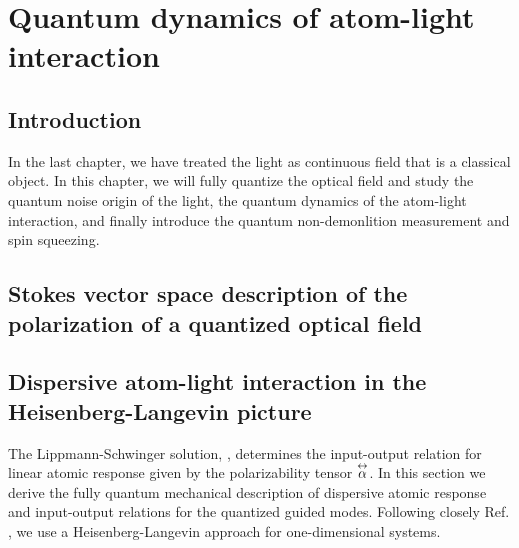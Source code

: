 \chapter{Quantum dynamics of atom-light interaction}
\section{Introduction}
In the last chapter, we have treated the light as continuous field that is a classical object. 
In this chapter, we will fully quantize the optical field and study the quantum noise origin of the light, the quantum dynamics of the atom-light interaction, and finally introduce the quantum non-demonlition measurement and spin squeezing. 

\section[Stokes vector description of photons' polarization measurement]{Stokes vector space description of the polarization of a quantized optical field}


\section{Dispersive atom-light interaction in the Heisenberg-Langevin picture}
The Lippmann-Schwinger solution, , determines the input-output relation for linear atomic response given by the polarizability tensor $\overset{\leftrightarrow}{\alpha}$.  In this section we derive the fully quantum mechanical description of dispersive atomic response and input-output relations for the quantized guided modes.  Following closely Ref. \cite{LeKien2005a}, we use a Heisenberg-Langevin approach for one-dimensional systems.  

